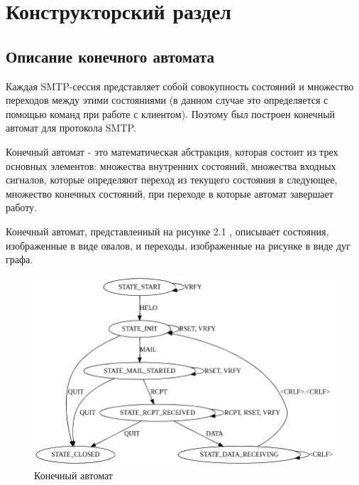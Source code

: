 \documentclass[a4paper,12pt]{report}
\begin{document}
	\chapter{Конструкторский раздел}
    
	\section{Описание конечного автомата}
    
	Каждая SMTP-сессия представляет собой совокупность состояний и множество переходов между этими состояниями 
	(в данном случае это определяется с помощью команд при работе с клиентом). Поэтому был построен конечный автомат для протокола SMTP.

	Конечный автомат - это математическая абстракция, которая состоит из трех основных элементов: 
	множества внутренних состояний, множества входных сигналов, которые определяют переход из текущего
	 состояния в следующее, множество конечных состояний, при переходе в которые автомат завершает работу.

	Конечный автомат, представленный на рисунке 2.1 , описывает состояния, изображенные в виде овалов, 
	и переходы, изображенные на рисунке в виде дуг графа.
	\begin{figure}
		\centering
		\includegraphics[scale=0.5]{smtp}
		\caption{Конечный автомат} 
	\end{figure}
    
\end{document}
